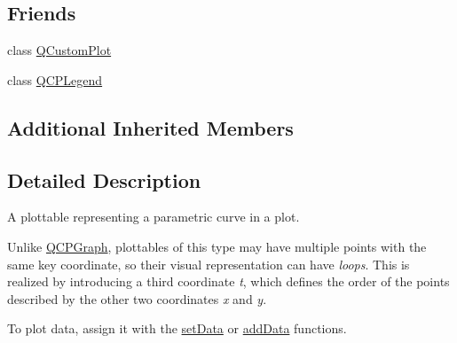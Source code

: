 \subsection*{Friends}
\begin{DoxyCompactItemize}
\item 
class \hyperlink{class_q_c_p_curve_a1cdf9df76adcfae45261690aa0ca2198}{Q\+Custom\+Plot}
\item 
class \hyperlink{class_q_c_p_curve_a8429035e7adfbd7f05805a6530ad5e3b}{Q\+C\+P\+Legend}
\end{DoxyCompactItemize}
\subsection*{Additional Inherited Members}


\subsection{Detailed Description}
A plottable representing a parametric curve in a plot. 



Unlike \hyperlink{class_q_c_p_graph}{Q\+C\+P\+Graph}, plottables of this type may have multiple points with the same key coordinate, so their visual representation can have {\itshape loops}. This is realized by introducing a third coordinate {\itshape t}, which defines the order of the points described by the other two coordinates {\itshape x} and {\itshape y}.

To plot data, assign it with the \hyperlink{class_q_c_p_curve_a631ac886708460013b30052f49cbc9da}{set\+Data} or \hyperlink{class_q_c_p_curve_a4e24023c3b9ac75440c7a260172c99af}{add\+Data} functions.

